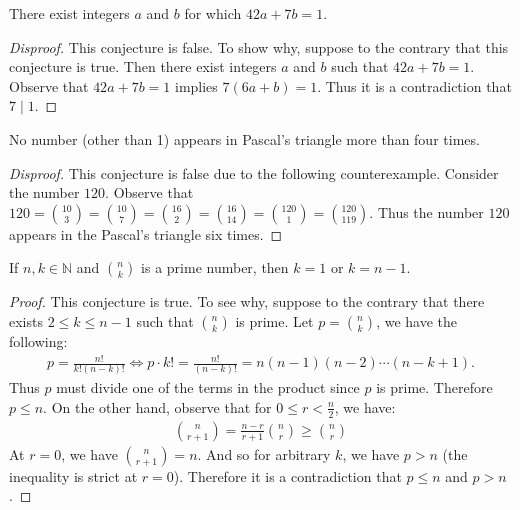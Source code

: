 \documentclass{exam}
\begin{document}
\begin{conjecture}{9.30}
    There exist integers $a$ and $b$ for which $42a + 7b = 1$.
\end{conjecture}

\begin{proof}[Disproof]
    This conjecture is false. To show why, suppose to the contrary that this conjecture is true. Then there exist integers $a$ and $b$ such that $42a + 7b = 1$. Observe that $42a + 7b = 1$ implies $7(6a + b)=1$. Thus it is a contradiction that $7\mid 1$.
\end{proof}

\begin{conjecture}{9.31}
    No number (other than 1) appears in Pascal's triangle more than four times.
\end{conjecture}

\begin{proof}[Disproof]
    This conjecture is false due to the following counterexample. Consider the number $120$. Observe that $120 = \binom{10}3 = \binom{10}7=\binom{16}2=\binom{16}{14}=\binom{120}1=\binom{120}{119}$. Thus the number $120$ appears in the Pascal's triangle six times.
\end{proof}

\begin{conjecture}{9.32}
    If $n,k\in\mathbb N$ and $\binom n k$ is a prime number, then $k = 1$ or $k=n-1$.
\end{conjecture}

\begin{proof}
    This conjecture is true. To see why, suppose to the contrary that there exists $2\le k\le n-1$ such that $\binom n k$ is prime. Let $p=\binom n k$, we have the following:
    \begin{align*}
        p = \frac{n!}{k!(n-k)!}\iff p\cdot k!=\frac{n!}{(n-k)!}=n(n-1)(n-2)\cdots(n-k+1).
    \end{align*}
    Thus $p$ must divide one of the terms in the product since $p$ is prime. Therefore $p\le n$. On the other hand, observe that for $0\le r<\frac n 2$, we have: 
    \begin{align*}
        \binom{n}{r+1} = \frac{n-r}{r+1}\binom n r \ge \binom n r
    \end{align*}
    At $r = 0$, we have $\binom{n}{r+1}=n$. And so for arbitrary $k$, we have $p > n$ (the inequality is strict at $r=0$). Therefore it is a contradiction that $p \le n$ and $p > n$.
\end{proof}
\end{document}
